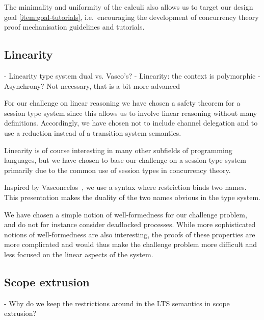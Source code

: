 \documentclass[runningheads]{llncs}
\begin{document}
The minimality and uniformity of the calculi also allows us to target our
design goal \ref{item:goal-tutorials}, i.e.~encouraging the development of
concurrency theory proof mechanisation guidelines and tutorials.



\subsection{Linearity}
- Linearity type system dual vs. Vasco's?
- Linearity: the context is polymorphic
- Asynchrony? Not necessary, that is a bit more advanced

For our challenge on linear reasoning we have chosen a safety theorem
for a session type system since this allows us to involve linear
reasoning without many definitions. Accordingly, we have chosen not to
include channel delegation and to use a reduction instead of a
transition system semantics.

Linearity is of course interesting in many other subfields of programming languages, but we have chosen to base our challenge on a session type system primarily due to the common use of session types in concurrency theory.

Inspired by Vasconcelos~\cite{Vasconcelos2012}, we use a syntax where
restriction binds two names. This presentation makes the duality
of the two names obvious in the type system.

We have chosen a simple notion of well-formedness for our challenge problem,
and do not for instance consider deadlocked processes. While more
sophisticated notions of well-formedness are also interesting, the
proofs of these properties are more complicated and would thus make
the challenge problem more difficult and less focused on the linear
aspects of the system.

\subsection{Scope extrusion}
- Why do we keep the restrictions around in the LTS semantics in scope extrusion?
\end{document}
